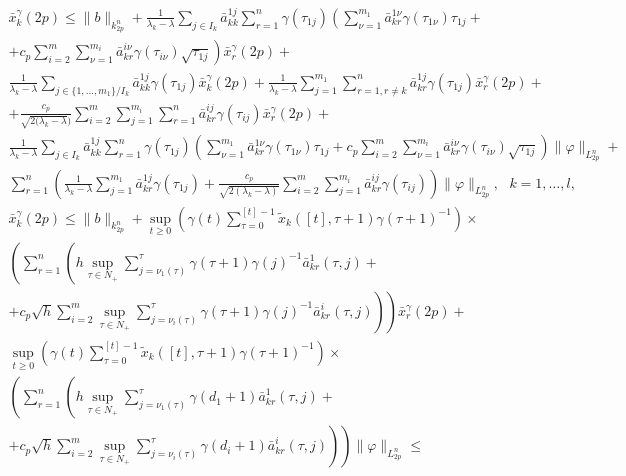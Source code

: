 $$
\begin{array}{crl}
\bar x_k^\gamma (2p) \leq  \|b\|_{k_{2p}^n} +
\frac{1}{\lambda _k - \lambda}\sum \limits_{j \in I_k}\bar
a^{1j}_{kk}\sum \limits_{r=1}^n\gamma (\tau _{1j})\left(\sum
\limits_{\nu=1}^{m_1}\bar a^{1\nu}_{kr} \gamma (\tau _{1\nu})\tau
_{1j} + 
\right. \\ \left. + 
c_p\sum \limits_{i=2}^m \sum \limits_{\nu=1}^{m_i}\bar
a^{i\nu}_{kr}\gamma (\tau
_{i\nu})\sqrt{\tau _{1j}}\right)\bar x_r^\gamma (2p) + \\
\frac{1}{\lambda _k - \lambda}\sum \limits_{ j \in\{1,\dots,m_1\}/
I_k}
 \bar a^{1j}_{kk}\gamma (\tau
_{1j})\bar x_k^\gamma (2p) + \frac{1}{\lambda _k - \lambda}\sum
\limits_{j=1}^{m_1}\sum \limits_{r=1,r\neq k}^{n} \bar
a^{1j}_{kr}\gamma (\tau _{1j})\bar x_r^\gamma (2p)+
\\ +
\frac{c_p}{\sqrt{2(\lambda_k -\lambda})}\sum \limits_{i=2}^m \sum
\limits_{j=1}^{m_i}\sum \limits_{r=1}^{n}\bar a^{ij}_{kr}\gamma
(\tau _{ij})\bar x_r^\gamma
(2p)+\\
\frac{1}{\lambda _k - \lambda}\sum \limits_{j \in I_k}\bar
a^{1j}_{kk}\sum \limits_{r=1}^n\gamma (\tau _{1j})\left(\sum
\limits_{\nu=1}^{m_1}\bar a^{1\nu}_{kr} \gamma (\tau _{1\nu})\tau
_{1j} + c_p\sum \limits_{i=2}^m \sum \limits_{\nu=1}^{m_i}\bar
a^{i\nu}_{kr}\gamma (\tau _{i\nu})\sqrt{\tau _{1j}}\right)\|\varphi
\|_{L_{2p}^n} +\\
\sum \limits_{r=1}^{n}\left(\frac{1}{\lambda _k - \lambda}\sum
\limits_{j=1}^{m_1}\bar a^{1j}_{kr}\gamma (\tau_{1j}) +
\frac{c_p}{\sqrt{2(\lambda_k -\lambda)}}\sum \limits_{i=2}^m \sum
\limits_{j=1}^{m_i}\bar a^{ij}_{kr}\gamma (\tau _{ij})\right)\|\varphi \|_{L_{2p}^n}, \ \ \ k = 1, \dots ,l,\\
 \bar x_k^\gamma (2p) \leq \|b\|_{k^n_{2p}}  + \mathrel {\mathop
{\sup} \limits _{t \geq 0}}\left(\gamma (t)\sum \limits _{\tau=0
}^{[t]-1}\tilde x_k([t],\tau + 1)\gamma (\tau +1)^{-1}\right)\times\\
\left(\sum \limits _{r=1 }^n \left(h\mathrel {\mathop {\sup}\limits
_{\tau \in N_+}}\sum \limits _{j=\nu _1 (\tau)}^{\tau}\gamma
(\tau + 1)\gamma (j)^{-1}\bar a^{1}_{kr}(\tau,j) +
\right. \right. \\ \left. \left. +
c_p\sqrt{h}\sum \limits _{i=2}^{m}\mathrel {\mathop {\sup} \limits
_{\tau \in N_+}}\sum \limits _{j=\nu _i (\tau)}^{\tau}\gamma
(\tau + 1)\gamma (j)^{-1}\bar a^{i}_{kr}(\tau,j) \right)\right)\bar
x_r^\gamma (2p)+\\
\mathrel {\mathop {\sup} \limits _{t \geq 0}}\left(\gamma (t)\sum
\limits _{\tau=0}^{[t]-1}\tilde x_k([t],\tau + 1)\gamma (\tau +1)^{-1}\right)\times \\
\left(\sum \limits _{r=1 }^n \left(h\mathrel {\mathop {\sup} \limits
_{\tau \in N_+}}\sum \limits _{j=\nu _1 (\tau)}^{\tau}\gamma (d_1
+1)\bar a^{1}_{kr}(\tau,j) +
\right. \right. \\ \left. \left. +
c_p\sqrt{h}\sum \limits
_{i=2}^{m}\mathrel {\mathop {\sup} \limits _{\tau \in N_+}}\sum
\limits _{j=\nu _i (\tau)}^{\tau}\gamma (d_i +1)\bar
a^{i}_{kr}(\tau,j)\right)\right)\|\varphi \|_{L_{2p}^n} \leq
\end{array}
$$

